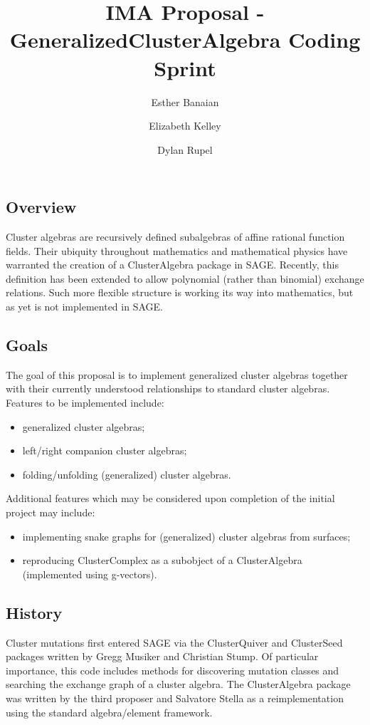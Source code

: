 \documentclass{amsart}
\title{IMA Proposal - GeneralizedClusterAlgebra Coding Sprint}
\author{Esther Banaian}
\author{Elizabeth Kelley}
\author{Dylan Rupel}
\begin{document}
  \maketitle

  \subsection*{Overview}
  Cluster algebras are recursively defined subalgebras of affine rational function fields.
  Their ubiquity throughout mathematics and mathematical physics have warranted the creation of a ClusterAlgebra package in SAGE.
  Recently, this definition has been extended to allow polynomial (rather than binomial) exchange relations.
  Such more flexible structure is working its way into mathematics, but as yet is not implemented in SAGE.

  \subsection*{Goals}
  The goal of this proposal is to implement generalized cluster algebras together with their currently understood relationships to standard cluster algebras.
  Features to be implemented include:
  \begin{itemize}
    \item generalized cluster algebras;
    \item left/right companion cluster algebras;
    \item folding/unfolding (generalized) cluster algebras.
  \end{itemize}
  Additional features which may be considered upon completion of the initial project may include:
  \begin{itemize}
    \item implementing snake graphs for (generalized) cluster algebras from surfaces;
    \item reproducing ClusterComplex as a subobject of a ClusterAlgebra (implemented using g-vectors).
  \end{itemize}

  \subsection*{History}
  Cluster mutations first entered SAGE via the ClusterQuiver and ClusterSeed packages written by Gregg Musiker and Christian Stump.  
  Of particular importance, this code includes methods for discovering mutation classes and searching the exchange graph of a cluster algebra.
  The ClusterAlgebra package was written by the third proposer and Salvatore Stella as a reimplementation using the standard algebra/element framework.
\end{document}
